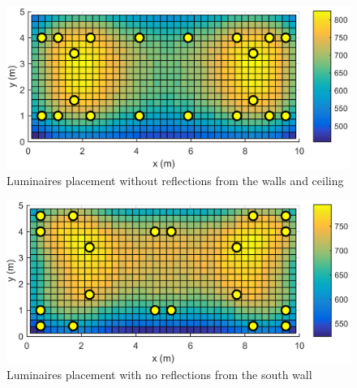 \begin{figure}[tb]
  \centering
  \includegraphics[width=\columnwidth]{../Vysledky/MSTR_SLB_4x18W_5G4_Fit2_NoRef_V010_S1}
  \caption{Luminaires placement without reflections from the walls and ceiling}
  \label{fig:V010_S1_NoRef}
\end{figure}

\begin{figure}[tb]
  \centering
  \includegraphics[width=\columnwidth]{../Vysledky/MSTR_SLB_4x18W_5G4_Fit2_NoSWall_V010_S1}
  \caption{Luminaires placement with no reflections from the south wall}
  \label{fig:V010_S1_NoSWall}
\end{figure}